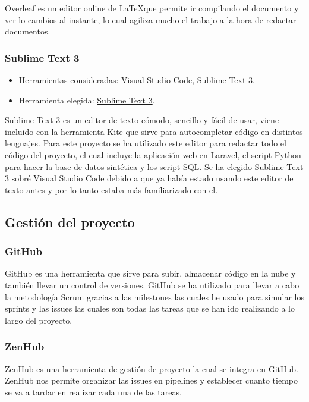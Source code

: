 Overleaf es un editor online de \LaTeX que permite ir compilando el documento y ver lo cambios al instante, lo cual agiliza mucho el trabajo a la hora de redactar documentos.

\subsubsection{Sublime Text 3}

\begin{itemize}
    \item Herramientas consideradas: \href{https://code.visualstudio.com/}{Visual Studio Code}, \href{https://www.sublimetext.com/3}{Sublime Text 3}.
	\item Herramienta elegida: \href{https://www.sublimetext.com/3}{Sublime Text 3}.
\end{itemize}

Sublime Text 3 es un editor de texto cómodo, sencillo y fácil de usar, viene incluido con la herramienta Kite que sirve para autocompletar código en distintos lenguajes. Para este proyecto se ha utilizado este editor para redactar todo el código del proyecto, el cual incluye la aplicación web en Laravel, el script Python para hacer la base de datos sintética y los script SQL. Se ha elegido Sublime Text 3 sobré Visual Studio Code debido a que ya había estado usando este editor de texto antes y por lo tanto estaba más familiarizado con el. 

\subsection{Gestión del proyecto}

\subsubsection{GitHub}

GitHub es una herramienta que sirve para subir, almacenar código en la nube y también llevar un control de versiones. GitHub se ha utilizado para llevar a cabo la metodología Scrum gracias a las milestones las cuales he usado para simular los sprints y las issues las cuales son todas las tareas que se han ido realizando a lo largo del proyecto. 

\subsubsection{ZenHub}

ZenHub es una herramienta de gestión de proyecto la cual se integra en GitHub. ZenHub nos permite organizar las issues en pipelines y establecer cuanto tiempo se va a tardar en realizar cada una de las tareas,

